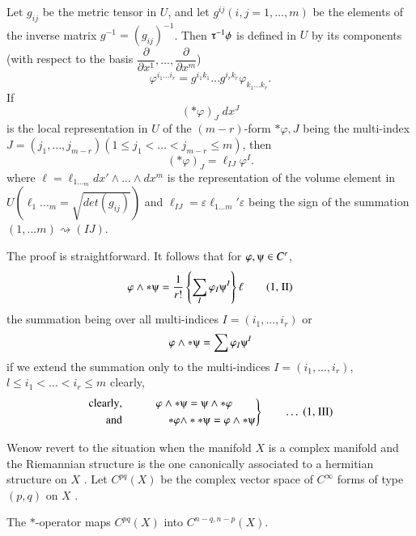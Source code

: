 Let $g_{ij}$ be the metric tensor in $U$, and let $g^{ij}(i,j=1,...,m)$
be the elements of the inverse matrix $g^{-1}=(g_{ij})^{-1}$. Then
$\tauup^{-1}\phi$ is defined in $U$ by its components (with respect to
the basis $\dfrac{\partial}{\partial
  x^1},...,\dfrac{\partial}{\partial x^m}$) 
$$
\varphi^{i_1 \ldots i_r}=g^{i_1 k_1} \ldots g^{i_r k_r} \varphi_{k_1
  \ldots k_r}.
$$
If  
$$
(*\varphi)_J \; dx^J
$$
is the local representation in $U$ of the $(m-r)$-form $* \varphi, J$ being
the multi-index $J =(j_1, \ldots, j_{m-r})(1 \le j_1 < \ldots <
j_{m-r}\le  m)$, then 
$$
(* \varphi)_J = \ell_{IJ} \varphi^I.
$$
where $\ell=\ell_{1 \ldots_m} dx' \wedge...\wedge dx^m$ is the
representation of the volume element in
$U (\ell_1..._m=\sqrt{det(g_{ij})})$ and $\ell_{IJ}=\varepsilon
\ell_{1 \ldots m}' \varepsilon$ being the sign of the summation
$(1,...m)\rightsquigarrow(IJ)$. 

The proof is straightforward. It follows that for $\varphi, \psiup \in
C^r$, 
\begin{equation}
  \varphi \wedge * \psiup =\dfrac{1}{r!}\left\{ \sum\limits_I
  \varphi_I \psiup^I \right\}\ell \tag{1, II} 
 \end{equation}
the summation being over all multi-indices $I=(i_1,...,i_r)$ or 
$$
\varphi \wedge * \psiup=\sum \varphi_I \psiup^I
$$
if we extend the summation only to the multi-indices
$I=(i_1,...,i_r)$, $l \leq i_1 < \ldots < i_r \leq m$ clearly,  
\begin{equation}
  \left.
  \begin{aligned}
    {\rm clearly}, &\qquad  &  \varphi \wedge * \psiup &=\psiup\wedge * \varphi\\
    {\rm and } & \qquad &  *\varphi \wedge &** \psiup=\varphi \wedge * \psiup
  \end{aligned}
  \right\} \tag*{$\dots$ (1, III)}
\end{equation} 

We\pageoriginale now revert to the situation when the manifold $X$ is
a complex manifold and the Riemannian  
structure is the one canonically associated to a hermitian structure
on $X$ .  Let $C^{pq}(X)$ be the  
complex vector space of $C^\infty$ forms of type $(p,q)$ on $X$ .

\begin{lemma}%
  The $*$-operator maps $C^{pq}(X)$ into  $C^{n-q,n-p} (X)$. 
\end{lemma}

